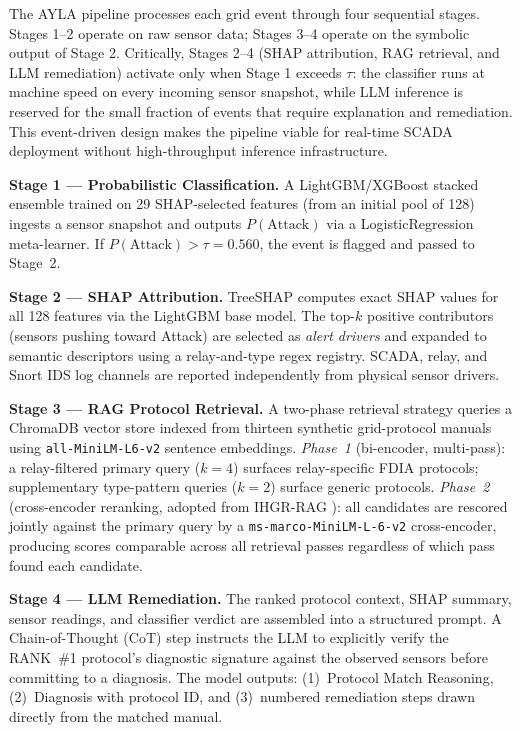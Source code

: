\documentclass[twocolumn, 10pt, letterpaper]{article}
\begin{document}
The AYLA pipeline processes each grid event through four sequential stages.
Stages 1--2 operate on raw sensor data; Stages 3--4 operate on the symbolic output
of Stage 2.
Critically, Stages 2--4 (SHAP attribution, RAG retrieval, and LLM remediation)
activate only when Stage 1 exceeds $\tau$: the classifier runs at machine speed on
every incoming sensor snapshot, while LLM inference is reserved for the small
fraction of events that require explanation and remediation.
This event-driven design makes the pipeline viable for real-time SCADA deployment
without high-throughput inference infrastructure.

\medskip\noindent
\textbf{Stage 1 --- Probabilistic Classification.}
A LightGBM/XGBoost stacked ensemble trained on 29 SHAP-selected features
(from an initial pool of 128) ingests a sensor snapshot and outputs
$P(\text{Attack})$ via a LogisticRegression meta-learner.
If $P(\text{Attack}) > \tau = 0.560$, the event is flagged and passed to Stage~2.

\medskip\noindent
\textbf{Stage 2 --- SHAP Attribution.}
TreeSHAP \cite{lundberg2020treeshap} computes exact SHAP values for all 128 features
via the LightGBM base model.
The top-$k$ positive contributors (sensors pushing toward Attack) are selected
as \textit{alert drivers} and expanded to semantic descriptors using a relay-and-type
regex registry.
SCADA, relay, and Snort IDS log channels are reported independently from physical
sensor drivers.

\medskip\noindent
\textbf{Stage 3 --- RAG Protocol Retrieval.}
A two-phase retrieval strategy queries a ChromaDB vector store indexed from
thirteen synthetic grid-protocol manuals using \texttt{all-MiniLM-L6-v2}
sentence embeddings.
\textit{Phase~1} (bi-encoder, multi-pass): a relay-filtered primary query ($k{=}4$)
surfaces relay-specific FDIA protocols; supplementary type-pattern queries ($k{=}2$)
surface generic protocols.
\textit{Phase~2} (cross-encoder reranking, adopted from IHGR-RAG
\cite{ihgrrag2025}): all candidates are rescored jointly against the primary query
by a \texttt{ms-marco-MiniLM-L-6-v2} cross-encoder, producing scores comparable
across all retrieval passes regardless of which pass found each candidate.

\medskip\noindent
\textbf{Stage 4 --- LLM Remediation.}
The ranked protocol context, SHAP summary, sensor readings, and classifier verdict
are assembled into a structured prompt.
A Chain-of-Thought (CoT) \cite{wei2022cot} step instructs the LLM to explicitly
verify the RANK~\#1 protocol's diagnostic signature against the observed sensors
before committing to a diagnosis.
The model outputs: (1)~Protocol Match Reasoning, (2)~Diagnosis with protocol ID,
and (3)~numbered remediation steps drawn directly from the matched manual.
\end{document}
